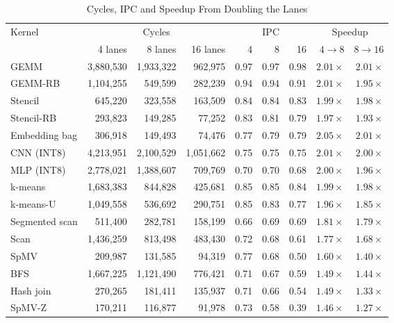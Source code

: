 \begin{table}[t]
\caption{Cycles, IPC and Speedup From Doubling the Lanes}
\label{tab:lanes_cyc}
\centering\footnotesize
\setlength{\tabcolsep}{4.5pt}
\begin{tabular}{lrrrrrrrr}
\toprule
Kernel & \multicolumn{3}{c}{Cycles} & \multicolumn{3}{c}{IPC} & \multicolumn{2}{c}{Speedup}\\
\cmidrule(lr){2-4}\cmidrule(lr){5-7}\cmidrule(lr){8-9}
 & 4 lanes & 8 lanes & 16 lanes & 4 & 8 & 16 & $4\to8$ & $8\to16$\\
\midrule
GEMM           & 3,880,530 & 1,933,322 & 962,975   & 0.97 & 0.97 & 0.98 & $2.01\times$ & $2.01\times$\\
GEMM-RB        & 1,104,255 & 549,599   & 282,239   & 0.94 & 0.94 & 0.91 & $2.01\times$ & $1.95\times$\\
Stencil        & 645,220   & 323,558   & 163,509   & 0.84 & 0.84 & 0.83 & $1.99\times$ & $1.98\times$\\
Stencil-RB     & 293,823   & 149,285   & 77,252    & 0.83 & 0.81 & 0.79 & $1.97\times$ & $1.93\times$\\
Embedding bag  & 306,918   & 149,493   & 74,476    & 0.77 & 0.79 & 0.79 & $2.05\times$ & $2.01\times$\\
CNN (INT8)     & 4,213,951 & 2,100,529 & 1,051,662 & 0.75 & 0.75 & 0.75 & $2.01\times$ & $2.00\times$\\
MLP (INT8)     & 2,778,021 & 1,388,607 & 709,769   & 0.70 & 0.70 & 0.68 & $2.00\times$ & $1.96\times$\\
k-means        & 1,683,383 & 844,828   & 425,681   & 0.85 & 0.85 & 0.84 & $1.99\times$ & $1.98\times$\\
k-means-U      & 1,049,558 & 536,692   & 290,751   & 0.85 & 0.83 & 0.77 & $1.96\times$ & $1.85\times$\\
Segmented scan & 511,400   & 282,781   & 158,199   & 0.66 & 0.69 & 0.69 & $1.81\times$ & $1.79\times$\\
Scan           & 1,436,259 & 813,498   & 483,430   & 0.72 & 0.68 & 0.61 & $1.77\times$ & $1.68\times$\\
SpMV           & 209,987   & 131,585   & 94,319    & 0.77 & 0.68 & 0.50 & $1.60\times$ & $1.40\times$\\
BFS            & 1,667,225 & 1,121,490 & 776,421   & 0.71 & 0.67 & 0.59 & $1.49\times$ & $1.44\times$\\
Hash join      & 270,265   & 181,411   & 135,937   & 0.71 & 0.66 & 0.54 & $1.49\times$ & $1.33\times$\\
SpMV-Z         & 170,211   & 116,877   & 91,978    & 0.73 & 0.58 & 0.39 & $1.46\times$ & $1.27\times$\\
\bottomrule
\end{tabular}

\end{table}

